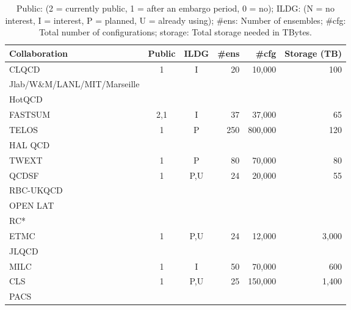 \documentclass[a4paper,11pt]{article}
\begin{document}
\begin{table}[h]
  \caption{ Public: (2 = currently public, 1 = after an embargo period, 0 = no); ILDG: (N = no interest, I =
    interest, P = planned, U = already using); \#ens: Number of
    ensembles; \#cfg: Total number of configurations; storage: Total
    storage needed in TBytes.
    \label{tab:summary}
  }
  \centering
  \begin{tabular}{lccrrr}\hline\hline
    Collaboration                & Public & ILDG & \#ens & \#cfg   & Storage (TB) \\\hline
    CLQCD                        & 1      & I    & 20    & 10,000  & 100          \\
    Jlab/W\&M/LANL/MIT/Marseille &        &      &       &         &              \\
    HotQCD                       &        &      &       &         &              \\
    FASTSUM                      & 2,1    & I    & 37    & 37,000  & 65           \\
    TELOS                        & 1      & P    & 250   & 800,000 & 120          \\
    HAL QCD                      &        &      &       &         &              \\
    TWEXT                        & 1      & P    & 80    & 70,000  & 80           \\
    QCDSF                        & 1      & P,U  & 24    & 20,000  & 55           \\
    RBC-UKQCD                    &        &      &       &         &              \\
    OPEN LAT                     &        &      &       &         &              \\
    RC*                          &        &      &       &         &              \\
    ETMC                         & 1      & P,U  & 24    & 12,000  & 3,000        \\
    JLQCD                        &        &      &       &         &              \\
    MILC                         & 1      & I    & 50    & 70,000  & 600          \\
    CLS                          & 1      & P,U  & 25    & 150,000 & 1,400        \\
    PACS                         &        &      &       &         &              \\\hline\hline
  \end{tabular}
\end{table}
\end{document}
